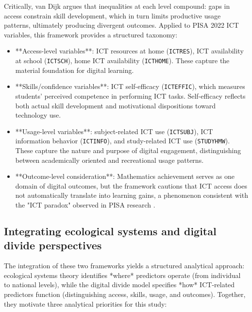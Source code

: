 \documentclass[pdflatex,sn-mathphys-ay]{sn-jnl}
\begin{document}
Critically, van Dijk argues that inequalities at each level compound: gaps in access constrain skill development, which in turn limits productive usage patterns, ultimately producing divergent outcomes. Applied to PISA 2022 ICT variables, this framework provides a structured taxonomy:

\begin{itemize}
\item **Access-level variables**: ICT resources at home (\texttt{ICTRES}), ICT availability at school (\texttt{ICTSCH}), home ICT availability (\texttt{ICTHOME}). These capture the material foundation for digital learning.
\item **Skills/confidence variables**: ICT self-efficacy (\texttt{ICTEFFIC}), which measures students' perceived competence in performing ICT tasks. Self-efficacy reflects both actual skill development and motivational dispositions toward technology use.
\item **Usage-level variables**: subject-related ICT use (\texttt{ICTSUBJ}), ICT information behavior (\texttt{ICTINFO}), and study-related ICT use (\texttt{STUDYHMW}). These capture the nature and purpose of digital engagement, distinguishing between academically oriented and recreational usage patterns.
\item **Outcome-level consideration**: Mathematics achievement serves as one domain of digital outcomes, but the framework cautions that ICT access does not automatically translate into learning gains, a phenomenon consistent with the "ICT paradox" observed in PISA research \citep{Joshi_2025_digital_literacy}.
\end{itemize}

\FloatBarrier
\subsection{Integrating ecological systems and digital divide perspectives}

The integration of these two frameworks yields a structured analytical approach: ecological systems theory identifies *where* predictors operate (from individual to national levels), while the digital divide model specifies *how* ICT-related predictors function (distinguishing access, skills, usage, and outcomes). Together, they motivate three analytical priorities for this study:
\end{document}
